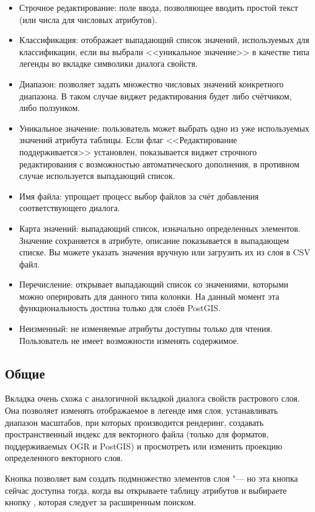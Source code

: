 \begin{itemize}[label=--]
\item Строчное редактирование: поле ввода, позволяющее вводить простой текст
(или числа для числовых атрибутов).
\item Классификация: отображает выпадающий список значений, используемых для
классификации, если вы выбрали <<уникальное значение>> в качестве типа легенды
во вкладке символики диалога свойств.
\item Диапазон: позволяет задать множество числовых значений конкретного диапазона.
В таком случае виджет редактирования будет либо счётчиком, либо ползунком.
\item Уникальное значение: пользователь может выбрать одно из уже используемых
значений атрибута таблицы. Если флаг <<Редактирование поддерживается>> установлен,
показывается виджет строчного редактирования с возможностью автоматического
дополнения, в противном случае используется выпадающий список.
\item Имя файла: упрощает процесс выбор файлов за счёт добавления
соответствующего диалога.
\item Карта значений: выпадающий список, изначально определенных элементов.
Значение сохраняется в атрибуте, описание показывается в выпадающем списке.
Вы можете указать значения вручную или загрузить их из слоя в CSV файл.
\item Перечисление: открывает выпадающий список со значениями, которыми
можно оперировать для данного типа колонки. На данный момент эта
функциональность достпна только для слоёв PostGIS.
\item Неизменный: не изменяемые атрибуты доступны только для чтения.
Пользователь не имеет возможности изменять содержимое.
\end{itemize}

\subsection{Общие}\label{vectorgeneraltab}

Вкладка  очень схожа с аналогичной вкладкой диалога свойств
растрового слоя. Она позволяет изменять отображаемое в легенде имя слоя,
устанавливать диапазон масштабов, при которых производится рендеринг,
создавать пространственный индекс для векторного файла (только для форматов,
поддерживаемых OGR и PostGIS) и просмотреть или изменить проекцию
определенного векторного слоя.

Кнопка  позволяет вам создать подмножество
элементов слоя "--- но эта кнопка сейчас доступна тогда, когда вы
открываете таблицу атрибутов и выбираете кнопку , которая
следует за расширенным поиском.

